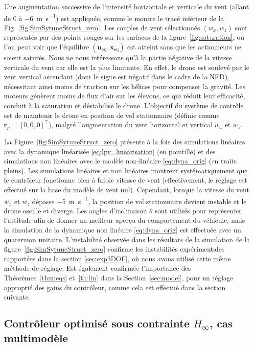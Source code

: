 Une augmentation successive de l'intensité horizontale et verticale du vent (allant de 0 à \SI{-6}{\meter\per\second}) est appliquée, comme le montre le tracé inférieur de la Fig.~\ref{fig:SimSytuneStruct_zero}. Les couples de vent sélectionnés $(w_{x}, w_{z})$ sont représentés par des points rouges sur les surfaces de la figure~\ref{fig:saturation}, où l'on peut voir que l'équilibre $(\boldsymbol{u}_{\text{eq}}, \boldsymbol{x}_{\text{eq}})$ est atteint sans que les actionneurs ne soient saturés. Nous ne nous intéressons qu'à la partie négative de la vitesse verticale du vent car elle est la plus limitante. En effet, le drone est soulevé par le vent vertical ascendant (dont le signe est négatif dans le cadre de la NED), nécessitant ainsi moins de traction sur les hélices pour compenser la gravité. Les moteurs génèrent moins de flux d'air sur les élevons, ce qui réduit leur efficacité, conduit à la saturation et déstabilise le drone.
L'objectif du système de contrôle est de maintenir le drone en position de vol stationnaire (définie comme $\boldsymbol{r}_{p} = [0,0,0]^\top$), malgré l'augmentation du vent horizontal et vertical $w_{x}$ et $w_{z}$. 


La Figure~\ref{fig:SimSytuneStruct_zero} présente à la fois des simulations linéaires avec la dynamique linéarisée \eqref{eq:lpv_linearisation} (en pointillé) et des simulations non linéaires avec le modèle non-linéaire \eqref{eq:dyna_orig} (en traits pleins). Les simulations linéaires et non linéaires montrent systématiquement que le contrôleur fonctionne bien à faible vitesse de vent (effectivement, le réglage est effectué sur la base du modèle de vent nul). Cependant, lorsque la vitesse du vent $w_{x}$ et $w_{z}$ dépasse \SI{-5}{\meter\per\second}, la position de vol stationnaire devient instable et le drone oscille et diverge. Les angles d'inclinaison $\theta$ sont utilisés pour représenter l'attitude afin de donner un meilleur aperçu du comportement du véhicule, mais la simulation de la dynamique non linéaire \eqref{eq:dyna_orig} est effectuée avec un quaternion unitaire. L'instabilité observée dans les résultats de la simulation de la figure~\ref{fig:SimSytuneStruct_zero} confirme les instabilités expérimentales rapportées dans la section \ref{sec:exp3DOF}, où nous avons utilisé cette même méthode de réglage. Est également confirmée l'importance des Théorèmes~\ref{thm:eqs} et~\ref{th:lin} dans la Section~\ref{sec:model}, pour un réglage approprié des gains du contrôleur, comme cela est effectué dans la section suivante.


\subsection{Contrôleur optimisé sous contrainte $H_{\infty}$, cas multimodèle}
\label{sec:h_inf6DOF_multi}

